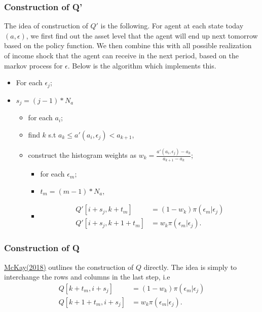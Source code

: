 \documentclass[12pt]{article}
\begin{document}
\subsubsection*{Construction of Q'}
The idea of construction of $Q'$ is the following. For agent at each state today $(a, \epsilon)$, we first find out the asset level that the agent will end up next tomorrow based on the policy function. We then combine this with all possible realization of income shock that the agent can receive in the next period, based on the markov process for $\epsilon$. Below is the algorithm which implements this.
\begin{itemize}
\item For each $\epsilon_j$;
\item $s_j = (j-1)*N_a$
    \begin{itemize}
       \item  for each $a_i$;
       \item find $k$ s.t $a_k \leq a'(a_i, \epsilon_j) < a_{k+1}$,
       \item  construct the histogram weights as $w_k = \frac{a'(a_i, \epsilon_j) - a_k}{a_{k+1} - a_k}$;
       \begin{itemize}
        \item for each $\epsilon_m$;
        \item $t_m = (m-1)*N_a$,
        \item \begin{align*}
          Q'[i+s_j,k+t_m ] & = (1-w_k)\pi(\epsilon_m|\epsilon_j) \\
          Q'[i+s_j,k+1+t_m] & = w_k \pi(\epsilon_m|\epsilon_j) .
        \end{align*}
       \end{itemize}
    \end{itemize}
\end{itemize}

\subsubsection*{Construction of Q}
\href{https://alisdairmckay.com/Notes/HetAgents/Aiyagari.html}{McKay(2018)} outlines the construction of $Q$ directly. The idea is simply to interchange the rows and columns in the last step, i.e
\begin{align*}
          Q[k+t_m, i+s_j ] & = (1-w_k)\pi(\epsilon_m|\epsilon_j) \\
          Q[k+1+t_m, i+s_j] & = w_k \pi(\epsilon_m|\epsilon_j) .
\end{align*}
\end{document}
